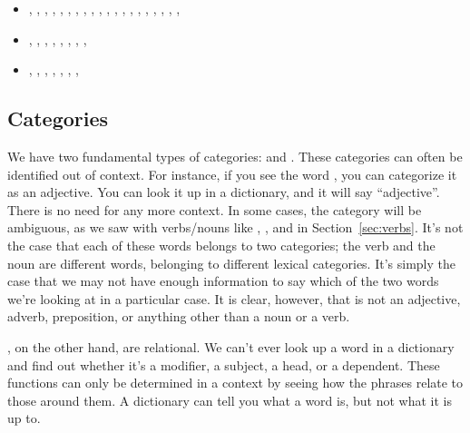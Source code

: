 \begin{itemize}[noitemsep]
    \item {}, , , , , , , , , , , , , , , , , , , , 
    \item {}, , , , , , , , 
    \item {}, , , , , , , 
\end{itemize}

\subsection{Categories}

We have two fundamental types of categories:  and . These categories can often be identified out of context. For instance, if you see the word , you can categorize it as an adjective. You can look it up in a dictionary, and it will say ``adjective''. There is no need for any more context. In some cases, the category will be ambiguous, as we saw with verbs/nouns like , , and  in Section~\ref{sec:verbs}. It's not the case that each of these words belongs to two categories; the verb  and the noun  are different words, belonging to different lexical categories. It's simply the case that we may not have enough information to say which of the two words we're looking at in a particular case. It is clear, however, that  is not an adjective, adverb, preposition, or anything other than a noun or a verb.

, on the other hand, are relational. We can't ever look up a word in a dictionary and find out whether it's a modifier, a subject, a head, or a dependent. These functions can only be determined in a context by seeing how the phrases relate to those around them. A dictionary can tell you what a word is, but not what it is up to.

